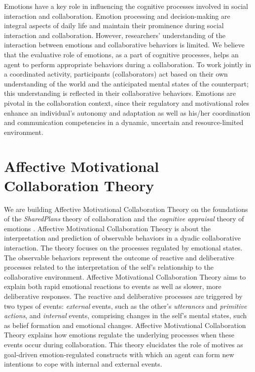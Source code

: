 \documentclass[letterpaper]{article}
\begin{document}
Emotions have a key role in influencing the cognitive processes involved in
social interaction and collaboration. Emotion processing and decision-making are
integral aspects of daily life and maintain their prominence during social
interaction and collaboration. However, researchers' understanding of the
interaction between emotions and collaborative behaviors is limited. We believe
that the evaluative role of emotions, as a part of cognitive processes, helps an
agent to perform appropriate behaviors during a collaboration. To work jointly
in a coordinated activity, participants (collaborators) act based on their own
understanding of the world and the anticipated mental states of the counterpart;
this understanding is reflected in their collaborative behaviors. Emotions are
pivotal in the collaboration context, since their regulatory and motivational
roles enhance an individual's autonomy and adaptation as well as his/her
coordination and communication competencies in a dynamic, uncertain and
resource-limited environment.

\section{Affective Motivational Collaboration Theory}

We are building Affective Motivational Collaboration Theory on the foundations
of the \textit{SharedPlans} theory of collaboration \cite{grosz:plans-discourse}
and the \textit{cognitive appraisal} theory of emotions
\cite{gratch:domain-independent}. Affective Motivational Collaboration Theory is
about the interpretation and prediction of observable behaviors in a dyadic
collaborative interaction. The theory focuses on the processes regulated by
emotional states. The observable behaviors represent the outcome of reactive and
deliberative processes related to the interpretation of the self's relationship
to the collaborative environment. Affective Motivational Collaboration Theory
aims to explain both rapid emotional reactions to events as well as slower, more
deliberative responses. The reactive and deliberative processes are triggered by
two types of events: \textit{external} events, such as the other's
\textit{utterances} and \textit{primitive actions}, and \textit{internal}
events, comprising changes in the self's mental states, such as belief formation
and emotional changes. Affective Motivational Collaboration Theory explains how
emotions regulate the underlying processes when these events occur during
collaboration. This theory elucidates the role of motives as goal-driven
emotion-regulated constructs with which an agent can form new intentions to cope
with internal and external events.
\end{document}
